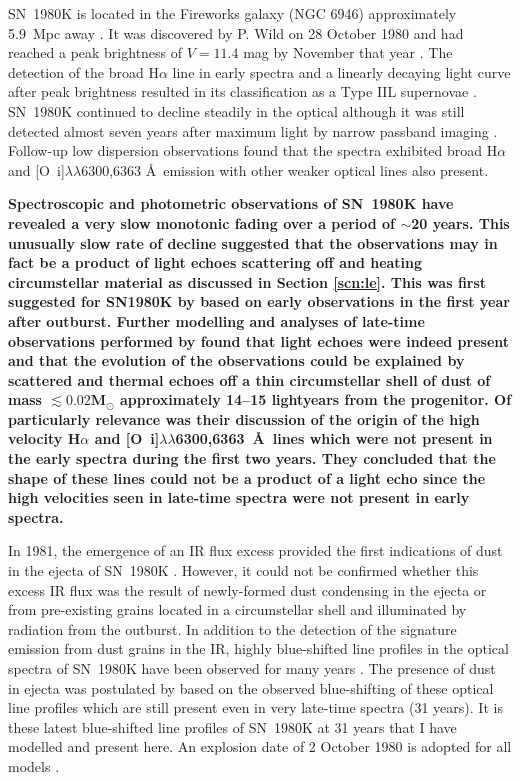SN~1980K is located in the Fireworks galaxy (NGC 6946) approximately 5.9~Mpc away \citep{Karachentsev2000}.  It was discovered by P. Wild on  28 October 1980 and  had reached a peak brightness of $V=11.4$ mag by November that year \citep{Buta1982}.   The detection of the broad H$\alpha$ line in early spectra and a linearly decaying light curve after peak brightness resulted in its classification as a Type IIL supernovae \citep{Barbon1982}.  SN~1980K continued to decline steadily in the optical although it was still detected almost seven years after maximum light by narrow passband imaging \citep{Fesen1988}.  Follow-up low dispersion observations found that the spectra exhibited broad H$\alpha$ and [O~{\sc i}]$\lambda\lambda$6300,6363 \AA\  emission with other weaker optical lines also present.  

{\bf Spectroscopic and photometric observations of SN~1980K have revealed a very slow monotonic fading over a period of $\sim$20 years.  This unusually slow rate of decline suggested that the observations may in fact be a product of light echoes scattering off  and heating circumstellar material as discussed in Section \ref{scn:le}.  This was first suggested for SN1980K by \citet{Chevalier1986} based on early observations in the first year after outburst.  Further modelling and analyses of late-time observations performed by \citet{Sugerman2012}  found that light echoes were indeed present and that the evolution of the observations could be explained by scattered and thermal echoes off a thin circumstellar shell of dust of mass $\lesssim 0.02$M$_{\odot}$ approximately 14--15 lightyears from the progenitor.  Of particularly relevance was their discussion of the origin of the high velocity H$\alpha$ and [O~{\sc i}]$\lambda\lambda$6300,6363~\AA\ lines which were not present in the early spectra during the first two years.  They concluded that the shape of these lines could not be a product of a light echo since the high velocities seen in late-time spectra were not present in early spectra.}

In 1981, the emergence of an IR flux excess provided the first indications of dust in the ejecta of SN~1980K \citep{Dwek1983}.  However, it could not be confirmed whether this excess IR flux was the result of newly-formed dust condensing in the ejecta or from pre-existing grains located in a circumstellar shell and illuminated by radiation from the outburst.  In addition to the detection of the signature emission from dust grains in the IR, highly blue-shifted line profiles in the optical spectra of SN~1980K have been observed for many years \citep{Fesen1990,Fesen1994,Fesen1995,Fesen1999}.  The presence of dust in ejecta was postulated by \citet{Milisavljevic2012} based on the observed blue-shifting of these optical line profiles which are still present even in very late-time spectra (31 years). It is these latest blue-shifted line profiles of SN~1980K at 31 years that I have modelled and present here.  An explosion date of 2 October 1980 is adopted for all models \citep{Montes1998}.


